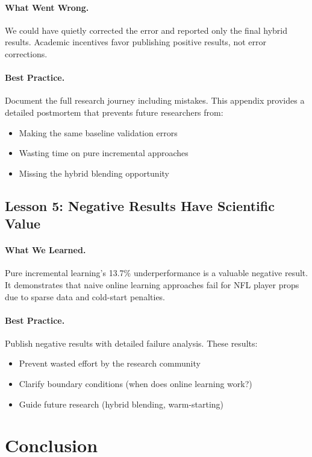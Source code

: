 \paragraph{What Went Wrong.} We could have quietly corrected the error and reported only the final hybrid results. Academic incentives favor publishing positive results, not error corrections.

\paragraph{Best Practice.} Document the full research journey including mistakes. This appendix provides a detailed postmortem that prevents future researchers from:
\begin{itemize}
\item Making the same baseline validation errors
\item Wasting time on pure incremental approaches
\item Missing the hybrid blending opportunity
\end{itemize}

\subsection{Lesson 5: Negative Results Have Scientific Value}

\paragraph{What We Learned.} Pure incremental learning's 13.7\% underperformance is a valuable negative result. It demonstrates that naive online learning approaches fail for NFL player props due to sparse data and cold-start penalties.

\paragraph{Best Practice.} Publish negative results with detailed failure analysis. These results:
\begin{itemize}
\item Prevent wasted effort by the research community
\item Clarify boundary conditions (when does online learning work?)
\item Guide future research (hybrid blending, warm-starting)
\end{itemize}

\section{Conclusion}

